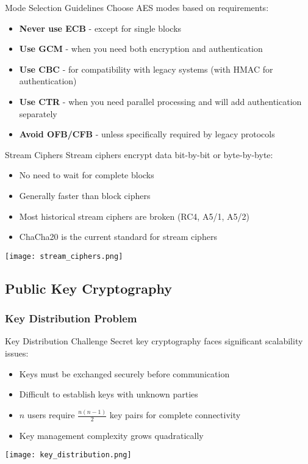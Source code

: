 \begin{theorem}{Mode Selection Guidelines}
Choose AES modes based on requirements:
\begin{itemize}
    \item \textbf{Never use ECB} - except for single blocks
    \item \textbf{Use GCM} - when you need both encryption and authentication
    \item \textbf{Use CBC} - for compatibility with legacy systems (with HMAC for authentication)
    \item \textbf{Use CTR} - when you need parallel processing and will add authentication separately
    \item \textbf{Avoid OFB/CFB} - unless specifically required by legacy protocols
\end{itemize}
\end{theorem}

\begin{concept}{Stream Ciphers}
    Stream ciphers encrypt data bit-by-bit or byte-by-byte:
    \begin{itemize}
        \item No need to wait for complete blocks
        \item Generally faster than block ciphers
        \item Most historical stream ciphers are broken (RC4, A5/1, A5/2)
        \item ChaCha20 is the current standard for stream ciphers
    \end{itemize}
    \texttt{[image: stream\_ciphers.png]}
\end{concept}

\subsection{Public Key Cryptography}

\subsubsection{Key Distribution Problem}

\begin{concept}{Key Distribution Challenge}
    Secret key cryptography faces significant scalability issues:
    \begin{itemize}
        \item Keys must be exchanged securely before communication
        \item Difficult to establish keys with unknown parties
        \item $n$ users require $\frac{n(n-1)}{2}$ key pairs for complete connectivity
        \item Key management complexity grows quadratically
    \end{itemize}
    \texttt{[image: key\_distribution.png]}
\end{concept}

